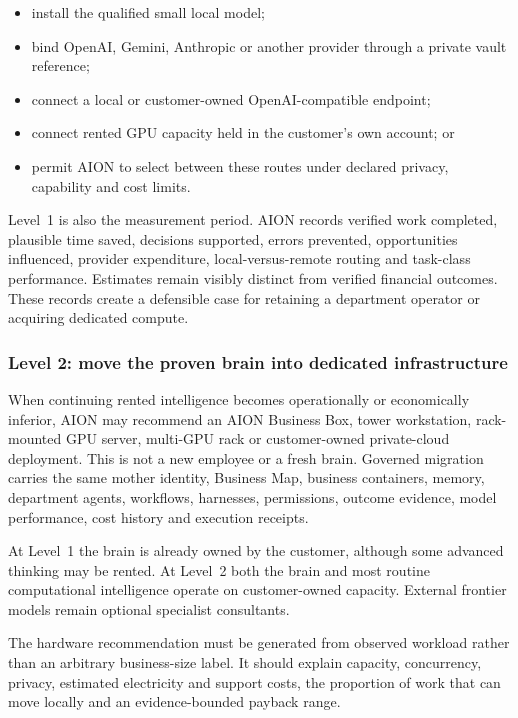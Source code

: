 \begin{itemize}
  \item install the qualified small local model;
  \item bind OpenAI, Gemini, Anthropic or another provider through a private vault reference;
  \item connect a local or customer-owned OpenAI-compatible endpoint;
  \item connect rented GPU capacity held in the customer's own account; or
  \item permit AION to select between these routes under declared privacy, capability and cost
        limits.
\end{itemize}

Level~1 is also the measurement period. AION records verified work completed, plausible time
saved, decisions supported, errors prevented, opportunities influenced, provider expenditure,
local-versus-remote routing and task-class performance. Estimates remain visibly distinct from
verified financial outcomes. These records create a defensible case for retaining a department
operator or acquiring dedicated compute.

\subsubsection{Level 2: move the proven brain into dedicated infrastructure}

When continuing rented intelligence becomes operationally or economically inferior, AION may
recommend an AION Business Box, tower workstation, rack-mounted GPU server, multi-GPU rack or
customer-owned private-cloud deployment. This is not a new employee or a fresh brain. Governed
migration carries the same mother identity, Business Map, business containers, memory, department
agents, workflows, harnesses, permissions, outcome evidence, model performance, cost history and
execution receipts.

At Level~1 the brain is already owned by the customer, although some advanced thinking may be
rented. At Level~2 both the brain and most routine computational intelligence operate on
customer-owned capacity. External frontier models remain optional specialist consultants.

The hardware recommendation must be generated from observed workload rather than an arbitrary
business-size label. It should explain capacity, concurrency, privacy, estimated electricity and
support costs, the proportion of work that can move locally and an evidence-bounded payback range.

